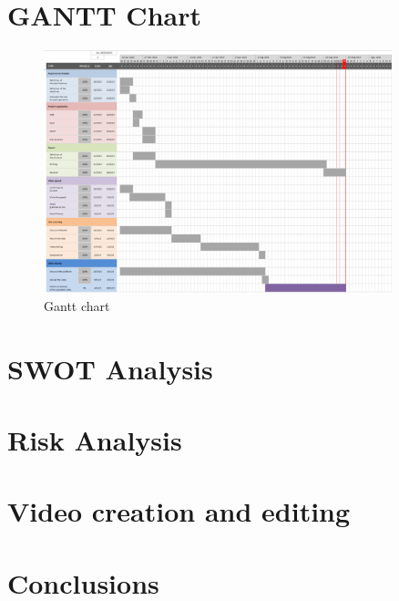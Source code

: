 \documentclass[eng]{class}
\begin{document}
\section{GANTT Chart}

\begin{figure}[h!]
  \centering
  \includegraphics[width=0.9\textwidth]{images/gantt.png}
  \caption{Gantt chart}
  \label{fig-2}
\end{figure}
\lipsum

\section{SWOT Analysis}
\section{Risk Analysis}
\section{Video creation and editing}

\section{Conclusions}

\pagestyle{OtherPage}
\end{document}
